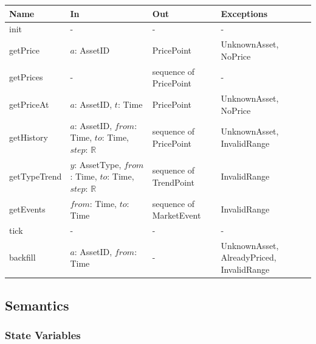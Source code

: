 \documentclass[12pt, titlepage]{article}
\begin{document}
\begin{center}
\renewcommand{\arraystretch}{1.2}
\begin{tabular}{>{\raggedright\arraybackslash}p{2.8cm}
  >{\raggedright\arraybackslash}p{4.8cm}
  >{\raggedright\arraybackslash}p{3cm}
  >{\raggedright\arraybackslash}p{3.4cm}}
\toprule
\textbf{Name} & \textbf{In} & \textbf{Out} & \textbf{Exceptions} \\
\midrule
init & - & - & - \\
getPrice & $a$: AssetID & PricePoint & UnknownAsset, NoPrice \\
getPrices & - & sequence of PricePoint & - \\
getPriceAt & $a$: AssetID, $t$: Time & PricePoint & UnknownAsset, NoPrice \\
getHistory & $a$: AssetID, $\mathit{from}$: Time, $\mathit{to}$: Time,
  $\mathit{step}$: $\mathbb{R}$ & sequence of PricePoint & UnknownAsset,
  InvalidRange \\
getTypeTrend & $y$: AssetType, $\mathit{from}$: Time, $\mathit{to}$: Time,
  $\mathit{step}$: $\mathbb{R}$ & sequence of TrendPoint & InvalidRange \\
getEvents & $\mathit{from}$: Time, $\mathit{to}$: Time & sequence of
  MarketEvent & InvalidRange \\
tick & - & - & - \\
backfill & $a$: AssetID, $\mathit{from}$: Time & - & UnknownAsset,
  AlreadyPriced, InvalidRange \\
\bottomrule
\end{tabular}
\end{center}

\subsection{Semantics}

\subsubsection{State Variables}
\end{document}
